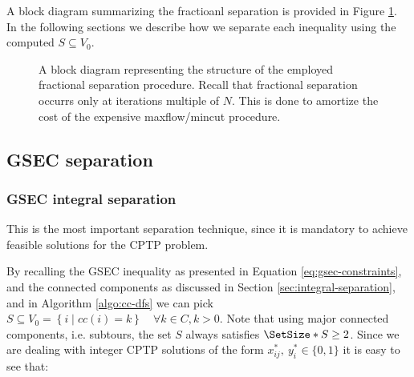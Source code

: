A block diagram summarizing the fractioanl separation is provided in Figure \ref{fig:fractional-separation-block-diagram}.
In the following sections we describe how we separate each inequality using the computed $S \subseteq V_0$.

\begin{figure}[ht]
	\centering
	\caption{A block diagram representing the structure of the employed fractional separation procedure. Recall that fractional separation occurrs only at iterations multiple of $N$. This is done to amortize the cost of the expensive maxflow/mincut procedure.}
	\label{fig:fractional-separation-block-diagram}
\end{figure}


\subsection{GSEC separation}

\subsubsection{GSEC integral separation}\label{sec:gsec-integral-separation}
This is the most important separation technique, since it is mandatory to achieve feasible solutions for the CPTP problem.

By recalling the GSEC inequality as presented in Equation \eqref{eq:gsec-constraints}, and the connected components as discussed in Section \ref{sec:integral-separation}, and in Algorithm \ref{algo:cc-dfs} we can pick $S \subseteq V_0 = \left\{ i \mid cc(i) = k  \right\}   \quad \forall k \in C, k > 0$.
Note that using major connected components, i.e. subtours, the set $S$ always satisfies $\SetSize*{S} \ge 2$.
Since we are dealing with integer CPTP solutions of the form $x^*_{ij},\ y^*_{i} \in \{0, 1\}$ it is easy to see that:

